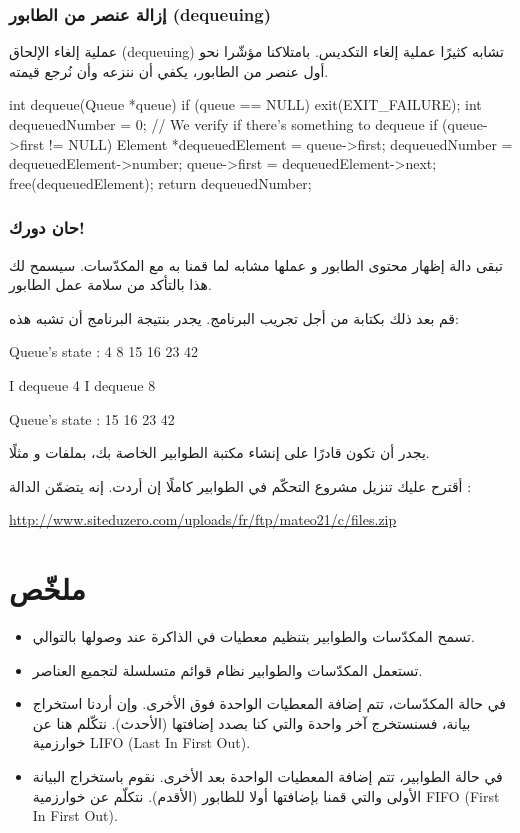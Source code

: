 \subsubsection{إزالة عنصر من الطابور (\textenglish{dequeuing})}

عملية إلغاء الإلحاق 
(\textenglish{dequeuing})
تشابه كثيرًا عملية إلغاء التكديس. بامتلاكنا مؤشّرا نحو أول عنصر من الطابور، يكفي أن ننزعه وأن نُرجع قيمته.

\begin{Csource}
int dequeue(Queue *queue)
{
	if (queue == NULL)
	{
		exit(EXIT_FAILURE);
	}
	int dequeuedNumber = 0;
	// We verify if there's something to dequeue
	if (queue->first != NULL)
	{
		Element *dequeuedElement = queue->first;
		dequeuedNumber = dequeuedElement->number;
		queue->first = dequeuedElement->next;
		free(dequeuedElement);
	}
	return dequeuedNumber;
}
\end{Csource}

\subsubsection{حان دورك!}

تبقى دالة إظهار محتوى الطابور
و عملها مشابه لما قمنا به مع المكدّسات. سيسمح لك هذا بالتأكد من سلامة عمل الطابور.

قم بعد ذلك بكتابة
من أجل تجريب البرنامج. يجدر بنتيجة البرنامج أن تشبه هذه:

\begin{Console}
Queue's state :
4 8 15 16 23 42

I dequeue 4
I dequeue 8

Queue's state :
15 16 23 42
\end{Console}

يجدر أن تكون قادرًا على إنشاء مكتبة الطوابير الخاصة بك، بملفات
و
مثلًا.

أقترح عليك تنزيل مشروع التحكّم في الطوابير كاملًا إن أردت. إنه يتضمّن الدالة
:

\url{http://www.siteduzero.com/uploads/fr/ftp/mateo21/c/files.zip}

\section*{ملخّص}

\begin{itemize}
	\item تسمح المكدّسات والطوابير بتنظيم معطيات في الذاكرة عند وصولها بالتوالي.
	\item تستعمل المكدّسات والطوابير نظام قوائم متسلسلة لتجميع العناصر.
	\item في حالة المكدّسات، تتم إضافة المعطيات الواحدة فوق الأخرى. وإن أردنا استخراج بيانة، فسنستخرج آخر واحدة والتي كنا بصدد إضافتها (الأحدث). نتكّلم هنا عن خوارزمية 
	\textenglish{LIFO} (\textenglish{Last In First Out}).
	\item في حالة الطوابير، تتم إضافة المعطيات الواحدة بعد الأخرى. نقوم باستخراج البيانة الأولى والتي قمنا بإضافتها أولا للطابور (الأقدم). نتكلّم عن خوارزمية
	\textenglish{FIFO} (\textenglish{First In First Out}).
\end{itemize}
